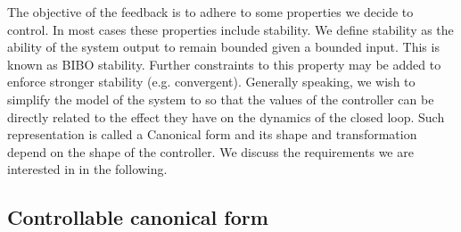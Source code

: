 \documentclass[a4paper,UKenglish]{lipics-v2018}
\begin{document}
The objective of the feedback is to adhere to some properties we decide to
control.  In most cases these properties include stability.  We define
stability as the ability of the system output to remain bounded given a
bounded input.  This is known as BIBO stability.  Further constraints to
this property may be added to enforce stronger stability (e.g.  convergent). 
Generally speaking, we wish to simplify the model of the system to so that
the values of the controller can be directly related to the effect they have
on the dynamics of the closed loop.  Such representation is called a
Canonical form and its shape and transformation depend on the shape of the
controller.  We discuss the requirements we are interested in in the
following.

\subsection{Controllable canonical form} \label{sec:reachable}
\end{document}
